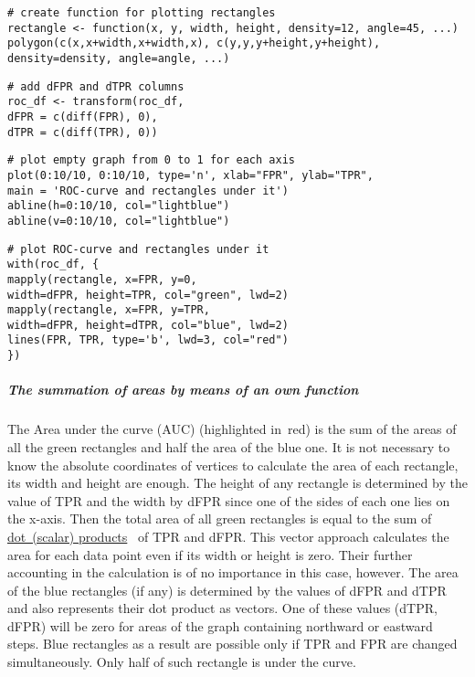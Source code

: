 \documentclass[]{scrreprt}
\begin{document}
%
\begin{lstlisting}[float=htp, caption = Create the \textbf{rectangle} function, firstnumber=1, label= lst:create-rectangle-function-r]
# create function for plotting rectangles
rectangle <- function(x, y, width, height, density=12, angle=45, ...) 
polygon(c(x,x+width,x+width,x), c(y,y,y+height,y+height), 
density=density, angle=angle, ...)
\end{lstlisting}
%
\begin{lstlisting}[float=htp, caption = Adding \textit{dFPR} and \textit{dTPR} columns, firstnumber=1, label= lst:add-dFPR&dTPR-columns-r]
# add dFPR and dTPR columns
roc_df <- transform(roc_df, 
dFPR = c(diff(FPR), 0),
dTPR = c(diff(TPR), 0))
\end{lstlisting}
%
\begin{lstlisting}[float=htp, caption = Drawing an~empty graph and marking axes from~0 to~1, firstnumber=1, label= lst:plot-empty-graph-from-0-to-1-r]
# plot empty graph from 0 to 1 for each axis
plot(0:10/10, 0:10/10, type='n', xlab="FPR", ylab="TPR",
main = 'ROC-curve and rectangles under it')
abline(h=0:10/10, col="lightblue")
abline(v=0:10/10, col="lightblue")
\end{lstlisting}
%
\begin{lstlisting}[float=htp, caption = Construction of~ROC curve and rectangles under~it, firstnumber=1, label= lst:plot-ROC-curve-and-rectangles-under-it-r]
# plot ROC-curve and rectangles under it
with(roc_df, {
mapply(rectangle, x=FPR, y=0,   
width=dFPR, height=TPR, col="green", lwd=2)
mapply(rectangle, x=FPR, y=TPR, 
width=dFPR, height=dTPR, col="blue", lwd=2)
lines(FPR, TPR, type='b', lwd=3, col="red")
})
\end{lstlisting}

\subparagraph{The summation of areas by means of an own function}
The Area under the curve (AUC) (highlighted in~red) is the sum of the areas of all the green rectangles and half the area of the blue one. It is not necessary to know the absolute coordinates of vertices to calculate the area of each rectangle, its width and height are enough. The height of any rectangle is determined by the value of TPR and the width by dFPR since one of the sides of each one lies on the x-axis. Then the total area of all green rectangles is equal to the sum of \href{https://en.wikipedia.org/wiki/Dot_product}{dot~(scalar) products}~\cite{Wiki:dot-product} of TPR and dFPR. This vector approach calculates the area for each data point even if its width or height is zero. Their further accounting in the calculation is of no importance in this case, however. The area of the blue rectangles (if any) is determined by the values of dFPR and dTPR and also represents their dot product as vectors. One of these values (dTPR, dFPR) will be zero for areas of the graph containing northward or eastward steps. Blue rectangles as a result are possible only if TPR and FPR are changed simultaneously. Only half of such rectangle is under the curve.
\end{document}
